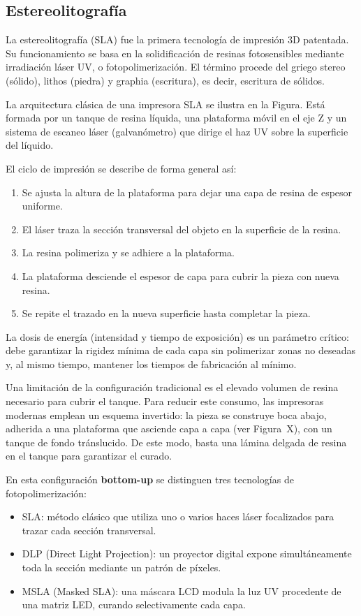 \subsection{Estereolitografía}

La estereolitografía (SLA) fue la primera tecnología de impresión 3D patentada. Su funcionamiento se basa en la solidificación de resinas fotosensibles mediante irradiación láser UV, o fotopolimerización. El término procede del griego stereo (sólido), lithos (piedra) y graphia (escritura), es decir, escritura de sólidos.

La arquitectura clásica de una impresora SLA se ilustra en la Figura. Está formada por un tanque de resina líquida, una plataforma móvil en el eje Z y un sistema de escaneo láser (galvanómetro) que dirige el haz UV sobre la superficie del líquido.

El ciclo de impresión se describe de forma general así:
\begin{enumerate}
	\item Se ajusta la altura de la plataforma para dejar una capa de resina de espesor uniforme.
	\item El láser traza la sección transversal del objeto en la superficie de la resina.
	\item La resina polimeriza y se adhiere a la plataforma.
	\item La plataforma desciende el espesor de capa para cubrir la pieza con nueva resina.
	\item Se repite el trazado en la nueva superficie hasta completar la pieza.
\end{enumerate}

La dosis de energía (intensidad y tiempo de exposición) es un parámetro crítico: debe garantizar la rigidez mínima de cada capa sin polimerizar zonas no deseadas y, al mismo tiempo, mantener los tiempos de fabricación al mínimo.

Una limitación de la configuración tradicional es el elevado volumen de resina necesario para cubrir el tanque. Para reducir este consumo, las impresoras modernas emplean un esquema invertido: la pieza se construye boca abajo, adherida a una plataforma que asciende capa a capa (ver Figura~X), con un tanque de fondo tránslucido. De este modo, basta una lámina delgada de resina en el tanque para garantizar el curado.

En esta configuración \textbf{bottom-up} se distinguen tres tecnologías de fotopolimerización:

\begin{itemize}
	\item SLA: método clásico que utiliza uno o varios haces láser focalizados para trazar cada sección transversal.
	\item DLP (Direct Light Projection): un proyector digital expone simultáneamente toda la sección mediante un patrón de píxeles.
	\item MSLA (Masked SLA): una máscara LCD modula la luz UV procedente de una matriz LED, curando selectivamente cada capa.
\end{itemize}

